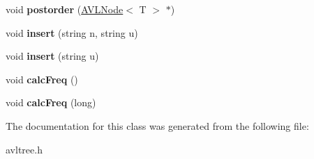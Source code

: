\begin{DoxyCompactItemize}
\item 
\hypertarget{classAVLTree_abbe21eccd1ef6535b42e8e6f3ca0996d}{void {\bfseries postorder} (\hyperlink{classAVLNode}{A\-V\-L\-Node}$<$ T $>$ $\ast$)}\label{classAVLTree_abbe21eccd1ef6535b42e8e6f3ca0996d}

\item 
\hypertarget{classAVLTree_acd0351673e8d95aaf932e40c0995cc30}{void {\bfseries insert} (string n, string u)}\label{classAVLTree_acd0351673e8d95aaf932e40c0995cc30}

\item 
\hypertarget{classAVLTree_a8b1d5f1dd571636b839de7c5bd6726f3}{void {\bfseries insert} (string u)}\label{classAVLTree_a8b1d5f1dd571636b839de7c5bd6726f3}

\item 
\hypertarget{classAVLTree_a508ed5ed8fe14d9f5c4419aea232939b}{void {\bfseries calc\-Freq} ()}\label{classAVLTree_a508ed5ed8fe14d9f5c4419aea232939b}

\item 
\hypertarget{classAVLTree_a07747e240e4c845c2495b681a733996c}{void {\bfseries calc\-Freq} (long)}\label{classAVLTree_a07747e240e4c845c2495b681a733996c}

\end{DoxyCompactItemize}


The documentation for this class was generated from the following file\-:\begin{DoxyCompactItemize}
\item 
avltree.\-h\end{DoxyCompactItemize}
